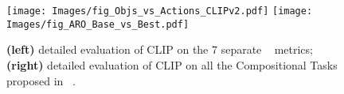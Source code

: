 \begin{figure}[]
\texttt{[image: Images/fig\_Objs\_vs\_Actions\_CLIPv2.pdf]}
\hfill \texttt{[image: Images/fig\_ARO\_Base\_vs\_Best.pdf]}
\label{fig:abl-diversity}
    \caption{\textbf{(left)} detailed evaluation of \ours{}CLIP on the 7 separate \vlchecklist{}~\cite{vlc} metrics; \textbf{(right)} detailed evaluation of \ours{}CLIP on all the Compositional Tasks proposed in \ARO{}~\cite{aro}. } 
    \label{fig:radar}
    \vspace{-1em}
\end{figure}